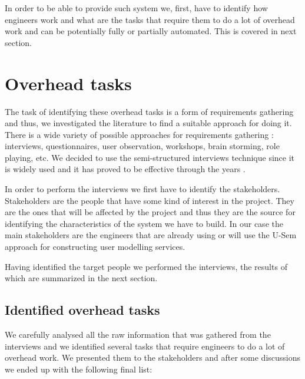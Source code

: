 In order to be able to provide such system we, first, have to identify how engineers work and what are the tasks that require them to do a lot of overhead work and can be potentially fully or partially automated. This is covered in next section.

\section{Overhead tasks}

The task of identifying these overhead tasks is a form of requirements gathering \cite{hickey2004unified} and thus, we investigated the literature to find a suitable approach for doing it. There is a wide variety of possible approaches for requirements gathering \cite{hickey2004unified} : interviews, questionnaires, user observation, workshops, brain storming, role playing, etc. We decided to use the semi-structured interviews technique since it is widely used and it has proved to be effective through the years \cite{dieste2008understanding}.

In order to perform the interviews we first have to identify the stakeholders. Stakeholders are the people that have some kind of interest in the project. They are the ones that will be affected by the project and thus they are the source for identifying the characteristics of the system we have to build. In our case the main stakeholders are the engineers that are already using or will use the U-Sem approach for constructing user modelling services. 

Having identified the target people we performed the interviews, the results of which are summarized in the next section. 

\subsection{Identified overhead tasks}
\label{sec:features}

We carefully analysed all the raw information that was gathered from the interviews and we identified several tasks that require engineers to do a lot of overhead work. We presented them to the stakeholders and after some discussions we ended up with the following final list: 

